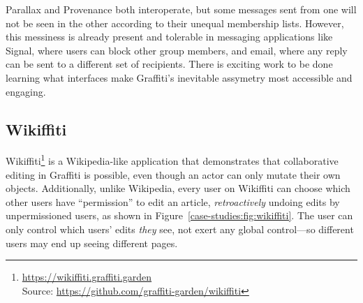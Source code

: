 
Parallax and Provenance both interoperate,
but some messages sent from one will not be seen in the other
according to their unequal membership lists. However, this messiness is already present and tolerable
in messaging applications like Signal, where users can block other group members,
and email, where any reply can be sent to a different set of recipients.
There is exciting work to be done learning what interfaces make
Graffiti's inevitable assymetry most accessible and engaging.




\subsection{Wikiffiti}
\label{case-studies:wikiffiti}

Wikiffiti\footnote{
\url{https://wikiffiti.graffiti.garden}\\Source: \url{https://github.com/graffiti-garden/wikiffiti}
} is a Wikipedia-like application that demonstrates that
collaborative editing in Graffiti is possible,
even though an actor can only mutate their own objects.
Additionally, unlike Wikipedia,
every user on Wikiffiti can choose which other users have ``permission'' to edit an article,
\emph{retroactively} undoing edits by unpermissioned users,
as shown in Figure~\ref{case-studies:fig:wikiffiti}.
The user can only control which users' edits \emph{they} see, not exert any global control---so different users may end up seeing different pages.

